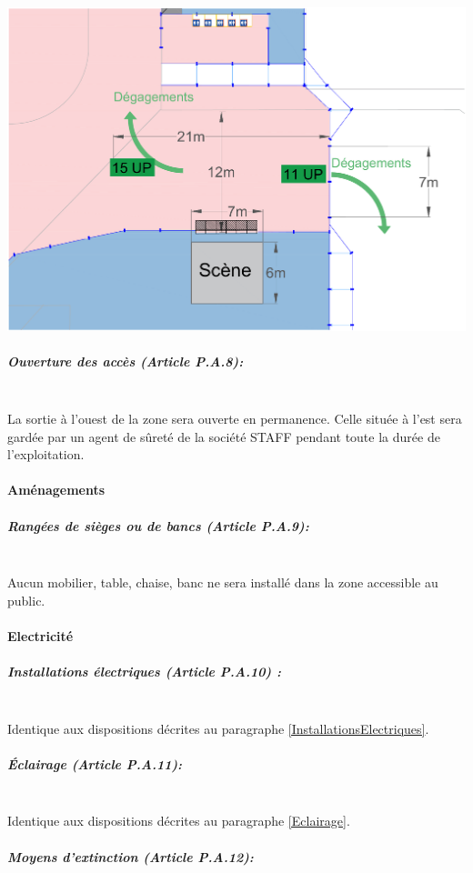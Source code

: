 \documentclass[hidelinks, paper=a4, fontsize=13pt]{report}
\begin{document}
\begin{center}
	\includegraphics[width=.8\textwidth,keepaspectratio]{Exports/Plan_24h_45eme-3e_Scene_Cotes}
\end{center}
\subparagraph*{Ouverture des accès (Article P.A.8):}\mbox{}\\
La sortie à l'ouest de la zone sera ouverte en permanence. Celle située à l'est sera gardée par un agent de sûreté de la société STAFF pendant toute la durée de l'exploitation.

\paragraph{Aménagements}

\subparagraph*{Rangées de sièges ou de bancs (Article P.A.9):}\mbox{}\\

Aucun mobilier, table, chaise, banc ne sera installé dans la zone accessible au public.

\paragraph{Electricité}

\subparagraph*{Installations électriques (Article P.A.10) :}\mbox{}\\

Identique aux dispositions décrites au paragraphe \ref{InstallationsElectriques}.

\subparagraph*{Éclairage (Article P.A.11):}\mbox{}\\

Identique aux dispositions décrites au paragraphe \ref{Eclairage}.

\subparagraph*{Moyens d'extinction (Article P.A.12):}\mbox{}\\
\end{document}
